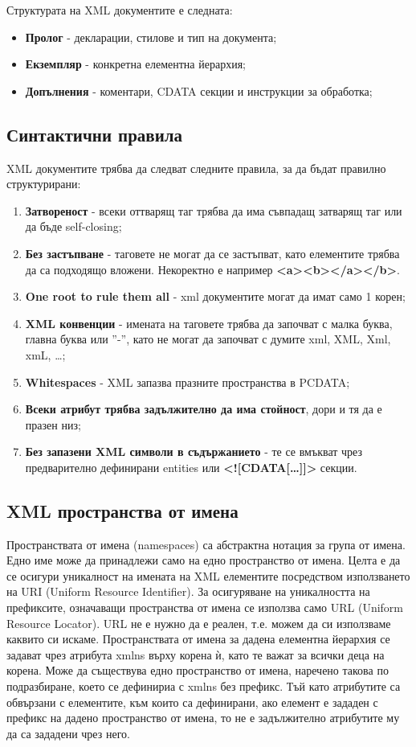 \documentclass[fleqn,12pt]{article}
\begin{document}
Структурата на XML документите е следната:
\begin{itemize}
    \item \textbf{Пролог} - декларации, стилове и тип на документа;
    \item \textbf{Екземпляр} - конкретна елементна йерархия;
    \item \textbf{Допълнения} - коментари, CDATA секции и инструкции за обработка;
\end{itemize}


\subsection{Синтактични правила}

XML документите трябва да следват следните правила, за да бъдат правилно структурирани:
\begin{enumerate}
    \item \textbf{Затвореност} - всеки оттварящ таг трябва да има съвпадащ затварящ таг или да бъде self-closing;
    \item \textbf{Без застъпване} - таговете не могат да се застъпват, като елементите трябва да са подходящо вложени. Некоректно е например \textbf{<a><b></a></b>}.
    \item \textbf{One root to rule them all} - xml документите могат да имат само 1 корен;
    \item \textbf{XML конвенции} - имената на таговете трябва да започват с малка буква, главна буква или ''-'', като не могат да започват с думите xml, XML, Xml, xmL, \dots;
    \item \textbf{Whitespaces} - XML запазва празните пространства в PCDATA;
    \item \textbf{Всеки атрибут трябва задължително да има стойност}, дори и тя да е празен низ;
    \item \textbf{Без запазени XML символи в съдържанието} - те се вмъкват чрез предварително дефинирани entities или \textbf{<![CDATA[\dots]]>} секции.
\end{enumerate}

\subsection{XML пространства от имена}

Пространствата от имена (namespaces) са абстрактна нотация за група от имена.
Едно име може да принадлежи само на едно пространство от имена.
Целта е да се осигури уникалност на имената на XML елементите посредством използването на URI (Uniform Resource Identifier).
За осигуряване на уникалността на префиксите, означаващи пространства от имена се използва само URL (Uniform Resource Locator).
URL не е нужно да е реален, т.е. можем да си използваме каквито си искаме.
\bigbreak
Пространствата от имена за дадена елементна йерархия се задават чрез атрибута xmlns върху корена ѝ, като те важат за всички деца на корена.
Може да съществува едно пространство от имена, наречено такова по подразбиране, което се дефинириа с xmlns без префикс.
Тъй като атрибутите са обвързани с елементите, към които са дефинирани, ако елемент е зададен с префикс на дадено пространство от имена, то не е задължително атрибутите му да са зададени чрез него.
\end{document}
